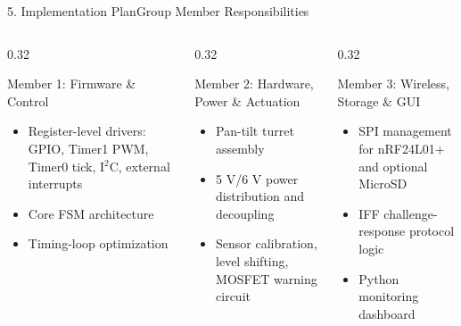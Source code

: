 \documentclass[aspectratio=169, 10pt]{beamer}
\begin{document}
\begin{frame}{5. Implementation Plan}{Group Member Responsibilities}
    \begin{columns}[T]
        \begin{column}{0.32\textwidth}
            \begin{block}{Member 1: Firmware \& Control}
                \small
                \begin{itemize}
                    \item Register-level drivers: GPIO, Timer1 PWM, Timer0 tick, I$^2$C, external interrupts
                    \item Core FSM architecture
                    \item Timing-loop optimization
                \end{itemize}
            \end{block}
        \end{column}
        \begin{column}{0.32\textwidth}
            \begin{block}{Member 2: Hardware, Power \& Actuation}
                \small
                \begin{itemize}
                    \item Pan-tilt turret assembly
                    \item 5 V/6 V power distribution and decoupling
                    \item Sensor calibration, level shifting, MOSFET warning circuit
                \end{itemize}
            \end{block}
        \end{column}
        \begin{column}{0.32\textwidth}
            \begin{block}{Member 3: Wireless, Storage \& GUI}
                \small
                \begin{itemize}
                    \item SPI management for nRF24L01+ and optional MicroSD
                    \item IFF challenge-response protocol logic
                    \item Python monitoring dashboard
                \end{itemize}
            \end{block}
        \end{column}
    \end{columns}
\end{frame}
\end{document}
